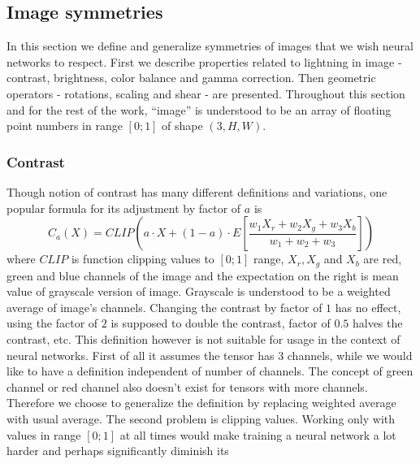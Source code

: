 \subsection{Image symmetries}
    \label{sec:transformations}
    In this section we define and generalize symmetries of images that we wish
    neural networks to respect. First we describe
    properties related to lightning in image - contrast,
    brightness, color balance and gamma correction. Then geometric operators -
    rotations, scaling and shear - are presented.
    Throughout this section and for the rest of the work,
    ``image'' is understood to be an array of
    floating point numbers in range $\left[0;1\right]$ of shape $\left(3, H,
    W\right)$.
    \subsubsection{Contrast}
    \newcommand\mcc{\mathcal{C}}
        Though notion of contrast has many different definitions and variations,
        one popular formula \cite{torch_contrast, tf_contrast}
        for its adjustment by factor of $a$ is
        \begin{equation}
            \label{eq:contrast_old}
        C_a(X) = \mathit{CLIP}\left(a\cdot X + (1-a) \cdot E\left[ \frac{w_1X_r
        + w_2X_g + w_3X_b}{w_1+w_2+w_3}\right]   \right)
        \end{equation}
        where
        $\mathit{CLIP}$ is function clipping values to $\left[0;1\right]$ range,
        $X_r, X_g$ and $X_b$ are red, green and blue channels of the image and
        the expectation on the right is mean value of grayscale version of
        image.  Grayscale is understood to be a weighted average of image's
        channels.  Changing the contrast by factor of $1$ has no effect, using
        the factor of $2$ is supposed to double the contrast, factor of $0.5$
        halves the contrast, etc.  This definition however is not suitable for
        usage in the context of neural networks.  First of all it assumes the
        tensor has 3 channels, while we would like to have a definition
        independent of number of channels. The concept of green channel or red
        channel also doesn't exist for tensors with more channels. Therefore we
        choose to generalize the definition by replacing weighted average with
        usual average. The second problem is clipping values. Working only with
        values in range $\left[0;1\right]$ at all times would make training a
        neural network a lot harder and perhaps significantly diminish its
